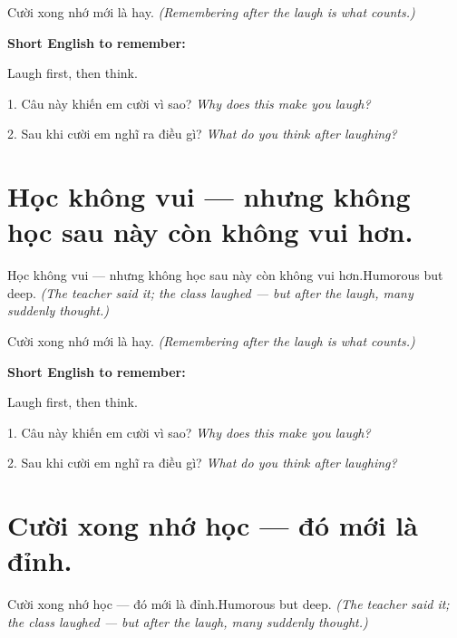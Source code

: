 \begin{baihoc}
Cười xong nhớ mới là hay.
\textit{(Remembering after the laugh is what counts.)}
\end{baihoc}

\begin{ghinhoanh}
\textbf{Short English to remember:}

Laugh first, then think.

\end{ghinhoanh}

\begin{tuhocnhanh}
1. Câu này khiến em cười vì sao? \textit{Why does this make you laugh?}

2. Sau khi cười em nghĩ ra điều gì? \textit{What do you think after laughing?}
\end{tuhocnhanh}
\ngancach


\section{Học không vui — nhưng không học sau này còn không vui hơn.}
\begin{truyen}{Học không vui — nhưng không học sau này còn không vui hơn.}{Humorous but deep.}
\textit{(The teacher said it; the class laughed — but after the laugh, many suddenly thought.)}
\end{truyen}

\begin{baihoc}
Cười xong nhớ mới là hay.
\textit{(Remembering after the laugh is what counts.)}
\end{baihoc}

\begin{ghinhoanh}
\textbf{Short English to remember:}

Laugh first, then think.

\end{ghinhoanh}

\begin{tuhocnhanh}
1. Câu này khiến em cười vì sao? \textit{Why does this make you laugh?}

2. Sau khi cười em nghĩ ra điều gì? \textit{What do you think after laughing?}
\end{tuhocnhanh}
\ngancach


\section{Cười xong nhớ học — đó mới là đỉnh.}
\begin{truyen}{Cười xong nhớ học — đó mới là đỉnh.}{Humorous but deep.}
\textit{(The teacher said it; the class laughed — but after the laugh, many suddenly thought.)}
\end{truyen}


